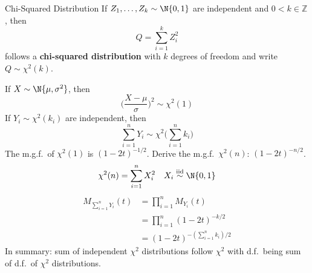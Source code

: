 \begin{Definition}{Chi-Squared Distribution}{}
    If $ Z_1,\ldots,Z_k \sim \N{0,1} $ are independent
    and $ 0<k\in\mathbb{Z} $, then
    \[ Q=\sum_{i=1}^{k} Z_i^2 \]
    follows a \textbf{chi-squared distribution}
    with $ k $ degrees of freedom and write
    $ Q \sim \chi^2(k) $.
\end{Definition}
If $ X \sim \N{\mu,\sigma^2} $, then
\[ \biggl(\frac{X-\mu}{\sigma}\biggr)^2 \sim \chi^2(1)  \]
If $ Y_i \sim \chi^2(k_i) $ are independent, then
\[ \sum_{i=1}^{n} Y_i \sim \chi^2\biggl(\sum_{i=1}^{n} k_i\biggr) \]
The m.g.f.\ of $ \chi^2(1) $ is $ (1-2t)^{-1/2} $. Derive
the m.g.f.\ $ \chi^2(n) $: $ (1-2t)^{-n/2} $.
\[ \chi^2(n)=\sum_{i=1}^{n} X_i^2\quad X_i\stackrel{\text{iid}}{\sim}\N{0,1}\]
\begin{align*}
    M_{\sum_{i=1}^{n} Y_i}(t)
     & =\prod_{i=1}^n M_{Y_i}(t)         \\
     & =\prod_{i=1}^n(1-2t)^{-k/2}       \\
     & =(1-2t)^{-(\sum_{i=1}^{n} k_i)/2}
\end{align*}
In summary: sum of independent $ \chi^2 $ distributions
follow $ \chi^2 $ with d.f.\ being sum of d.f.\ of
$ \chi^2 $ distributions.

